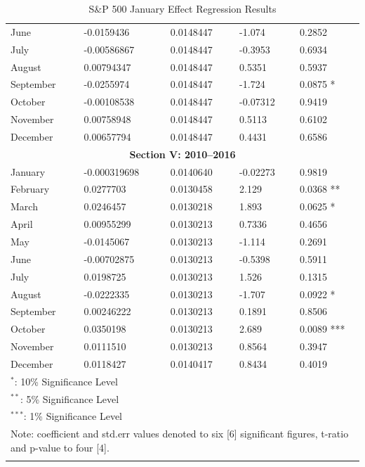 \documentclass[11pt, english]{article}
\begin{document}
\begin{center}
\begin{longtable}{p{2cm}p{2cm}p{2cm}p{2cm}p{2cm}}
                June & -0.0159436 & 0.0148447 & -1.074 & 0.2852\\
                July & -0.00586867 & 0.0148447 & -0.3953 & 0.6934\\
                August & 0.00794347 & 0.0148447 & 0.5351 & 0.5937\\
                September & -0.0255974 & 0.0148447 & -1.724 & 0.0875 *\\
                October & -0.00108538 & 0.0148447 & -0.07312 & 0.9419\\
                November & 0.00758948 & 0.0148447 & 0.5113 & 0.6102\\
                December & 0.00657794 & 0.0148447 & 0.4431 & 0.6586\\
                \hline
                \multicolumn{5}{c}{\textbf{Section V: 2010--2016}}\\ 
                \hline 
                January & -0.000319698 & 0.0140640 & -0.02273 & 0.9819\\
                February & 0.0277703 & 0.0130458 & 2.129 & 0.0368 **\\
                March & 0.0246457 & 0.0130218 & 1.893 & 0.0625 *\\
                April & 0.00955299 & 0.0130213 & 0.7336 & 0.4656\\
                May & -0.0145067 & 0.0130213 & -1.114 & 0.2691\\
                June & -0.00702875 & 0.0130213 & -0.5398 & 0.5911\\
                July & 0.0198725 & 0.0130213 & 1.526 & 0.1315\\
                August & -0.0222335 & 0.0130213 & -1.707 & 0.0922 *\\
                September & 0.00246222 & 0.0130213 & 0.1891 & 0.8506\\
                October & 0.0350198 & 0.0130213 & 2.689 & 0.0089 ***\\
                November & 0.0111510 & 0.0130213 & 0.8564 & 0.3947\\
                December & 0.0118427 & 0.0140417 & 0.8434 & 0.4019\\
                \hline                                             
                \multicolumn{5}{l}{$^*$: 10\% Significance Level}\\  
                \multicolumn{5}{l}{$^{**}$: 5\% Significance Level}\\ 
                \multicolumn{5}{l}{$^{***}$: 1\% Significance Level}\\
                \hline                                          
		\multicolumn{5}{p{11.5cm}}{Note: coefficient and std.err values denoted to six [6] significant figures, t-ratio and p-value to four [4].}\\
                \hline
		\caption{S\&P 500 January Effect Regression Results}
        \end{longtable}
        \end{center}
\end{document}
